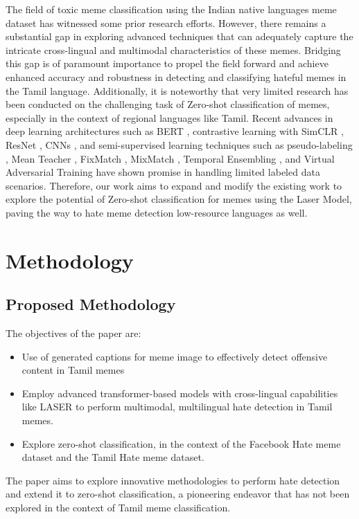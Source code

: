 \documentclass{ieeeaccess}
\begin{document}
The field of toxic meme classification using the Indian native languages meme dataset has witnessed some prior research efforts. However, there remains a substantial gap in exploring advanced techniques that can adequately capture the intricate cross-lingual and multimodal characteristics of these memes. Bridging this gap is of paramount importance to propel the field forward and achieve enhanced accuracy and robustness in detecting and classifying hateful memes in the Tamil language. Additionally, it is noteworthy that very limited research has been conducted on the challenging task of Zero-shot classification of memes, especially in the context of regional languages like Tamil. Recent advances in deep learning architectures such as BERT \cite{b14}, contrastive learning with SimCLR \cite{b15}, ResNet \cite{b16}, CNNs \cite{b17}, and semi-supervised learning techniques such as pseudo-labeling \cite{b18}, Mean Teacher \cite{b19}, FixMatch \cite{b20}, MixMatch \cite{b21}, Temporal Ensembling \cite{b22}, and Virtual Adversarial Training \cite{b23} have shown promise in handling limited labeled data scenarios. Therefore, our work aims to expand and modify the existing work to explore the potential of Zero-shot classification for memes using the Laser Model, paving the way to hate meme detection low-resource languages as well.





\section{Methodology}
\label{sec:methodology}

\subsection{Proposed Methodology}
The objectives of the paper are:
\begin{itemize}
\item Use of generated captions for meme image to effectively detect offensive content in Tamil memes
\item Employ advanced transformer-based models with cross-lingual capabilities like LASER to perform multimodal, multilingual hate detection in Tamil memes.
\item Explore zero-shot classification, in the context of the Facebook Hate meme dataset and the Tamil Hate meme dataset.
\end{itemize}

The paper aims to explore innovative methodologies to perform hate detection and extend it to zero-shot classification, a pioneering endeavor that has not been explored in the context of Tamil meme classification.
\end{document}
